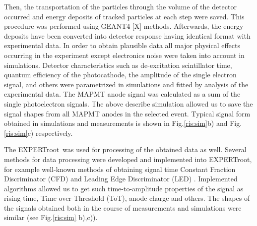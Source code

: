\documentclass{webofc}
\newcommand{\er}{\textmd{EXPERTroot}}
\begin{document}
	
	Then, the transportation of the particles through the volume of the detector occurred and energy deposits of tracked particles at each step were saved.
	This procedure was performed using GEANT4 {\color{red} [X]} methods. Afterwards, the energy deposits have been converted into detector response having identical format with experimental data.
	In order to obtain plausible data all major physical effects occurring in the experiment except electronics noise were taken into account in simulations.
	Detector characteristics such as de-excitation scintillator time, quantum efficiency of the photocathode, the amplitude of the single electron signal, and others were parametrized in simulations and fitted by analysis of the experimental data.
	The MAPMT anode signal was calculated as a sum of the single photoelectron signals.
	The above describe simulation allowed us to save the signal shapes  from all MAPMT anodes in the selected event.
	Typical signal form obtained in simulations and measurements is shown in Fig.\ref{ris:sim}b) and Fig.\ref{ris:sim}c) respectively.
	
	The \er\, was used for processing of the obtained data as well.
	Several methods for data processing were developed and implemented into \er, for example well-known methods of obtaining signal time Constant Fraction Discriminator (CFD) and Leading Edge Discriminator (LED) \cite{diplom}.
	Implemented algorithms allowed us to get such time-to-amplitude properties of the signal as rising time, Time-over-Threshold (ToT), anode charge and others. 
	The shapes of the signals obtained both in the course of measurements and simulations were similar (see Fig.\ref{ris:sim} b),c)).
	
\end{document}
